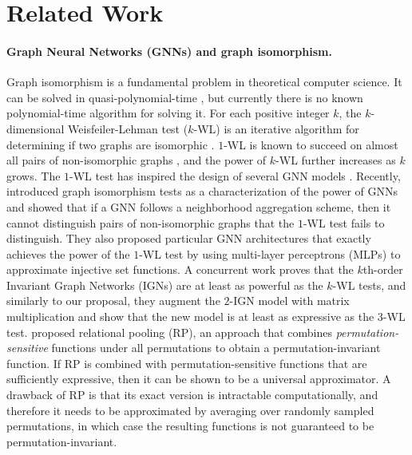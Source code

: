 \documentclass{article}
\begin{document}
\section{Related Work}
\paragraph{Graph Neural Networks (GNNs) and graph isomorphism.} Graph isomorphism is a fundamental problem in theoretical computer science. 
It can be solved in quasi-polynomial-time \cite{babai2016graph}, but currently there is no known polynomial-time algorithm for solving it. For each positive integer $k$, the $k$-dimensional Weisfeiler-Lehman test ($k$-WL) is an iterative algorithm for determining if two graphs are isomorphic \cite{weisfeiler1968reduction}. $1$-WL is known to succeed on almost all pairs of non-isomorphic graphs \cite{babai1980random}, and the power of $k$-WL further increases as $k$ grows. The $1$-WL test has inspired the design of several GNN models \cite{hamilton2017inductive, zhang2017wlnm}.
Recently,  
\cite{xu2018powerful, morris2019higher} introduced graph isomorphism tests as a characterization of the power of GNNs and showed that if a GNN follows a neighborhood aggregation scheme, then it cannot distinguish pairs of non-isomorphic graphs that the $1$-WL test fails to distinguish. They also proposed particular GNN architectures that exactly achieves the power of the $1$-WL test by using multi-layer perceptrons (MLPs) to approximate injective set functions. 
A concurrent work \cite{maron2019provably} proves that the $k$th-order Invariant Graph Networks (IGNs) are at least as powerful as the $k$-WL tests, and similarly to our proposal, they augment the $2$-IGN model with matrix multiplication and show that the new model is at least as expressive as the $3$-WL test. \cite{murphy2019relational} proposed relational pooling (RP), an approach that combines \textit{permutation-sensitive} functions under all permutations to obtain a permutation-invariant function. If RP is combined with permutation-sensitive functions that are sufficiently expressive, then it can be shown to be a universal approximator. 
A drawback of RP is that its exact version is intractable computationally, and therefore it needs to be approximated by averaging over randomly sampled permutations, in which case the resulting functions is not guaranteed to be permutation-invariant. 
\end{document}

